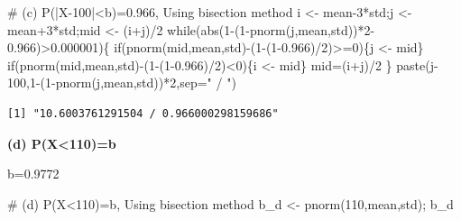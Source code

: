 \documentclass[
  a4paper,
  DIV=11,
  numbers=noendperiod]{scrreprt}
\newenvironment{Shaded}{\begin{snugshade}}{\end{snugshade}}
\newcommand{\AttributeTok}[1]{\textcolor[rgb]{0.40,0.45,0.13}{#1}}
\newcommand{\CommentTok}[1]{\textcolor[rgb]{0.37,0.37,0.37}{#1}}
\newcommand{\ControlFlowTok}[1]{\textcolor[rgb]{0.00,0.23,0.31}{#1}}
\newcommand{\DecValTok}[1]{\textcolor[rgb]{0.68,0.00,0.00}{#1}}
\newcommand{\FloatTok}[1]{\textcolor[rgb]{0.68,0.00,0.00}{#1}}
\newcommand{\FunctionTok}[1]{\textcolor[rgb]{0.28,0.35,0.67}{#1}}
\newcommand{\NormalTok}[1]{\textcolor[rgb]{0.00,0.23,0.31}{#1}}
\newcommand{\OtherTok}[1]{\textcolor[rgb]{0.00,0.23,0.31}{#1}}
\newcommand{\SpecialCharTok}[1]{\textcolor[rgb]{0.37,0.37,0.37}{#1}}
\newcommand{\StringTok}[1]{\textcolor[rgb]{0.13,0.47,0.30}{#1}}
\begin{document}
\begin{Shaded}
\begin{Highlighting}[]
\CommentTok{\# (c) P(|X{-}100|\textless{}b)=0.966, Using bisection method}
\NormalTok{i }\OtherTok{\textless{}{-}}\NormalTok{ mean}\DecValTok{{-}3}\SpecialCharTok{*}\NormalTok{std;j }\OtherTok{\textless{}{-}}\NormalTok{ mean}\SpecialCharTok{+}\DecValTok{3}\SpecialCharTok{*}\NormalTok{std;mid }\OtherTok{\textless{}{-}}\NormalTok{ (i}\SpecialCharTok{+}\NormalTok{j)}\SpecialCharTok{/}\DecValTok{2}
\ControlFlowTok{while}\NormalTok{(}\FunctionTok{abs}\NormalTok{(}\DecValTok{1}\SpecialCharTok{{-}}\NormalTok{(}\DecValTok{1}\SpecialCharTok{{-}}\FunctionTok{pnorm}\NormalTok{(j,mean,std))}\SpecialCharTok{*}\DecValTok{2}\FloatTok{{-}0.966}\NormalTok{)}\SpecialCharTok{\textgreater{}}\FloatTok{0.000001}\NormalTok{)\{}
  \ControlFlowTok{if}\NormalTok{(}\FunctionTok{pnorm}\NormalTok{(mid,mean,std)}\SpecialCharTok{{-}}\NormalTok{(}\DecValTok{1}\SpecialCharTok{{-}}\NormalTok{(}\DecValTok{1}\FloatTok{{-}0.966}\NormalTok{)}\SpecialCharTok{/}\DecValTok{2}\NormalTok{)}\SpecialCharTok{\textgreater{}=}\DecValTok{0}\NormalTok{)\{j }\OtherTok{\textless{}{-}}\NormalTok{ mid\}}
  \ControlFlowTok{if}\NormalTok{(}\FunctionTok{pnorm}\NormalTok{(mid,mean,std)}\SpecialCharTok{{-}}\NormalTok{(}\DecValTok{1}\SpecialCharTok{{-}}\NormalTok{(}\DecValTok{1}\FloatTok{{-}0.966}\NormalTok{)}\SpecialCharTok{/}\DecValTok{2}\NormalTok{)}\SpecialCharTok{\textless{}}\DecValTok{0}\NormalTok{)\{i }\OtherTok{\textless{}{-}}\NormalTok{ mid\}}
\NormalTok{  mid}\OtherTok{=}\NormalTok{(i}\SpecialCharTok{+}\NormalTok{j)}\SpecialCharTok{/}\DecValTok{2}
\NormalTok{\}}
\FunctionTok{paste}\NormalTok{(j}\DecValTok{{-}100}\NormalTok{,}\DecValTok{1}\SpecialCharTok{{-}}\NormalTok{(}\DecValTok{1}\SpecialCharTok{{-}}\FunctionTok{pnorm}\NormalTok{(j,mean,std))}\SpecialCharTok{*}\DecValTok{2}\NormalTok{,}\AttributeTok{sep=}\StringTok{" / "}\NormalTok{)}
\end{Highlighting}
\end{Shaded}

\begin{verbatim}
[1] "10.6003761291504 / 0.966000298159686"
\end{verbatim}

\textbf{(d) P(X\textless110)=b}

b=0.9772

\begin{Shaded}
\begin{Highlighting}[]
\CommentTok{\# (d) P(X\textless{}110)=b, Using bisection method}
\NormalTok{b\_d }\OtherTok{\textless{}{-}} \FunctionTok{pnorm}\NormalTok{(}\DecValTok{110}\NormalTok{,mean,std); b\_d}
\end{Highlighting}
\end{Shaded}
\end{document}
